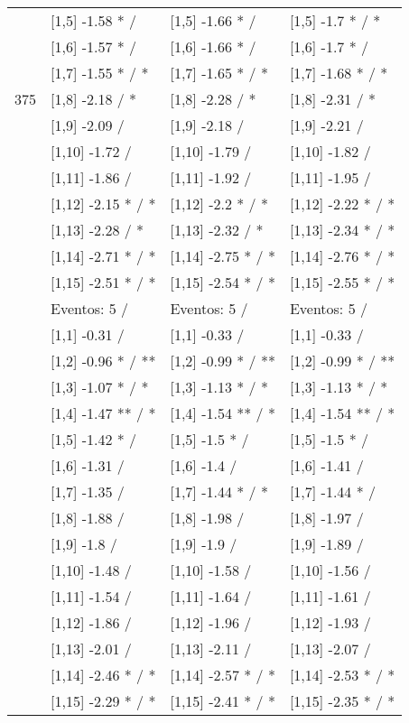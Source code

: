 \begin{table}
\begin{tabular}[t]{llll}
 & {}[1,5] -1.58 * / & {}[1,5] -1.66 * / & {}[1,5] -1.7 * / *\\
 & {}[1,6] -1.57 * / & {}[1,6] -1.66 * / & {}[1,6] -1.7 * /\\
 & {}[1,7] -1.55 * / * & {}[1,7] -1.65 * / * & {}[1,7] -1.68 * / *\\
375 & {}[1,8] -2.18  / * & {}[1,8] -2.28  / * & {}[1,8] -2.31  / *\\
\addlinespace
 & {}[1,9] -2.09  / & {}[1,9] -2.18  / & {}[1,9] -2.21  /\\
 & {}[1,10] -1.72  / & {}[1,10] -1.79  / & {}[1,10] -1.82  /\\
 & {}[1,11] -1.86  / & {}[1,11] -1.92  / & {}[1,11] -1.95  /\\
 & {}[1,12] -2.15 * / * & {}[1,12] -2.2 * / * & {}[1,12] -2.22 * / *\\
 & {}[1,13] -2.28  / * & {}[1,13] -2.32  / * & {}[1,13] -2.34 * / *\\
\addlinespace
 & {}[1,14] -2.71 * / * & {}[1,14] -2.75 * / * & {}[1,14] -2.76 * / *\\
 & {}[1,15] -2.51 * / * & {}[1,15] -2.54 * / * & {}[1,15] -2.55 * / *\\
 & Eventos:  5 / & Eventos:  5 / & Eventos:  5 /\\
 & {}[1,1] -0.31  / & {}[1,1] -0.33  / & {}[1,1] -0.33  /\\
 & {}[1,2] -0.96 * / ** & {}[1,2] -0.99 * / ** & {}[1,2] -0.99 * / **\\
\addlinespace
 & {}[1,3] -1.07 * / * & {}[1,3] -1.13 * / * & {}[1,3] -1.13 * / *\\
 & {}[1,4] -1.47 ** / * & {}[1,4] -1.54 ** / * & {}[1,4] -1.54 ** / *\\
 & {}[1,5] -1.42 * / & {}[1,5] -1.5 * / & {}[1,5] -1.5 * /\\
 & {}[1,6] -1.31  / & {}[1,6] -1.4  / & {}[1,6] -1.41  /\\
 & {}[1,7] -1.35  / & {}[1,7] -1.44 * / * & {}[1,7] -1.44 * /\\
\addlinespace
500 & {}[1,8] -1.88  / & {}[1,8] -1.98  / & {}[1,8] -1.97  /\\
 & {}[1,9] -1.8  / & {}[1,9] -1.9  / & {}[1,9] -1.89  /\\
 & {}[1,10] -1.48  / & {}[1,10] -1.58  / & {}[1,10] -1.56  /\\
 & {}[1,11] -1.54  / & {}[1,11] -1.64  / & {}[1,11] -1.61  /\\
 & {}[1,12] -1.86  / & {}[1,12] -1.96  / & {}[1,12] -1.93  /\\
\addlinespace
 & {}[1,13] -2.01  / & {}[1,13] -2.11  / & {}[1,13] -2.07  /\\
 & {}[1,14] -2.46 * / * & {}[1,14] -2.57 * / * & {}[1,14] -2.53 * / *\\
 & {}[1,15] -2.29 * / * & {}[1,15] -2.41 * / * & {}[1,15] -2.35 * / *\\
\bottomrule
\end{tabular}
\end{table}
